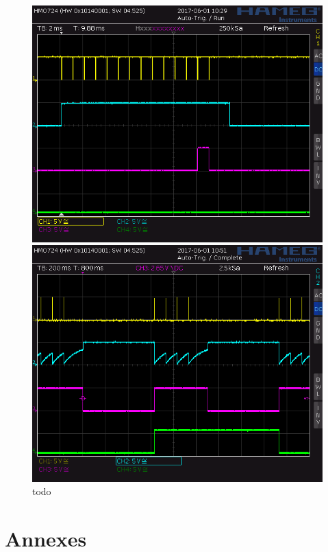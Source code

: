 \documentclass[french]{layout/Report}
\begin{document}
\begin{figure}
\begin{minipage}[b]{0.5\linewidth}
\end{minipage}
\begin{minipage}[b]{0.5\linewidth}
\vspace{0.05cm}
\centering
\includegraphics[width=\textwidth]{../measurements/SCR08}
\end{minipage}
\hspace{0.05cm}
\begin{minipage}[b]{0.5\linewidth}
\centering
\includegraphics[width=\textwidth]{../measurements/SCR12}
\end{minipage}
\caption{todo}
\end{figure}

\section{Annexes}
\end{document}
